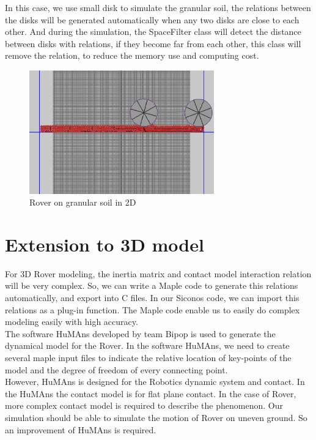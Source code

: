 In this case, we use small disk to simulate the granular soil, the relations between the disks will be generated automatically when any two disks are close to each other. And during the simulation, the SpaceFilter class will detect the distance between disks with relations, if they become far from each other, this class will remove the relation, to reduce the memory use and computing cost.


\begin{figure}[H]
 \begin{center}
      \includegraphics[width=8cm]{toto-0076.EPS}
      \caption{Rover on granular soil in 2D}
      \label{ROVER2D}
  \end{center}
\end{figure}


\section{Extension to 3D model}

For 3D Rover modeling, the inertia matrix and contact model interaction relation will be very complex. So, we can write a Maple code to generate this relations automatically, and export into C files. In our Siconos code, we can import this relations as a plug-in function. The Maple code enable us to easily do complex modeling easily with high accuracy. \\

The software HuMAns developed by team Bipop is used to generate the dynamical model for the Rover. In the software HuMAns, we need to create several maple input files to indicate the relative location of key-points of the model and the degree of freedom of every connecting point. \\

However, HuMAns is designed for the Robotics dynamic system and contact. In the HuMAns the contact model is for flat plane contact. In the case of Rover, more complex contact model is required to describe the phenomenon. Our simulation should be able to simulate the motion of Rover on uneven ground. So an improvement of HuMAns is required.

